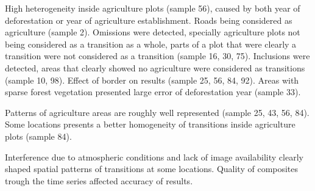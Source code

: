 \documentclass[essd, manuscript]{copernicus}
\begin{document}
High heterogeneity inside agriculture plots (sample 56), caused by both year of deforestation or year of agriculture establishment.
Roads being considered as agriculture (sample 2).
Omissions were detected, specially agriculture plots not being considered as a transition as a whole, parts of a plot that were clearly a transition were not considered as a transition (sample 16, 30, 75).
Inclusions were detected, areas that clearly showed no agriculture were considered as transitions (sample 10, 98).
Effect of border on results (sample 25, 56, 84, 92).
Areas with sparse forest vegetation presented large error of deforestation year (sample 33).

Patterns of agriculture areas are roughly well represented (sample 25, 43, 56, 84).
Some locations presents a better homogeneity of transitions inside agriculture plots (sample 84).

Interference due to atmospheric conditions and lack of image availability clearly shaped spatial patterns of transitions at some locations.
Quality of composites trough the time series affected accuracy of results.

\conclusions[Conclusions]


















\end{document}
